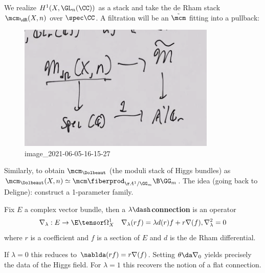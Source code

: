 \begin{remark}

We realize \(H^1(X, \GL_n(\CC))\) as a stack and take the de Rham stack
\(\mcm_{\dR}(X, n)\) over \(\spec \CC\). A filtration will be an
\(\tilde \mcm\) fitting into a pullback:

\begin{figure}
\centering
\includegraphics{figures/image_2021-06-05-16-15-27.png}
\caption{image\_2021-06-05-16-15-27}
\end{figure}

Similarly, to obtain \(\mcm_{\Dolbeaut}\) (the moduli stack of Higgs
bundles) as
\(\mcm_{\Dolbeaut}(X, n) \simeq \mcm \fiberprod_{\AA^1/\GG_m} \B \GG_m\).
The idea (going back to Deligne): construct a 1-parameter family.

\end{remark}

\begin{definition}[?]

Fix \(E\) a complex vector bundle, then a
\textbf{\(\lambda\dash\)connection} is an operator
\begin{align*}
\nabla_{\lambda}: E\to \E\tensor \Omega_X^1
&&
\nabla_{\lambda}(rf) = \lambda d(r) f + r\nabla(f), \nabla_{\lambda}^2 = 0
\end{align*}
where \(r\) is a coefficient and \(f\) is a section of \(E\) and \(d\)
is the de Rham differential.

\end{definition}

\begin{remark}

If \(\lambda=0\) this reduces to \(\nablda(rf) = r\nabla(f)\). Setting
\(\theta \da \nabla_0\) yields precisely the data of the Higgs field.
For \(\lambda=1\) this recovers the notion of a flat connection.

\end{remark}

